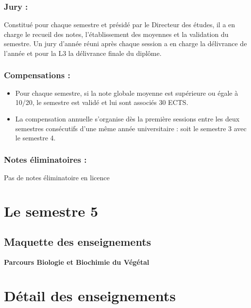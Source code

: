 \documentclass[10pt, a5paper]{report}
\begin{document}
\begin{spacing}{1.5}
\subsubsection*{Jury :} Constitué pour chaque semestre et présidé par le Directeur des études, il a en charge le recueil des notes, l’établissement des moyennes et la validation du semestre. Un jury d’année réuni après chaque session a en charge la délivrance de l’année et pour la L3 la délivrance finale du diplôme.

\subsubsection*{Compensations :}

\begin{itemize}
\item Pour chaque semestre, si la note globale moyenne est supérieure ou égale à 10/20, le semestre est validé et lui sont associés 30 ECTS.
\item La compensation annuelle s'organise dès la première sessions entre les deux semestres consécutifs d'une même année universitaire : soit le semestre 3 avec le semestre 4.
\end{itemize}

\subsubsection*{Notes éliminatoires :}

Pas de notes éliminatoire en licence

\newpage
\section*{Le semestre 5}

\subsection*{Maquette des enseignements}

\textbf{Parcours Biologie et Biochimie du Végétal}
\newline



\section*{Détail des enseignements}


\end{spacing}
\end{document}
